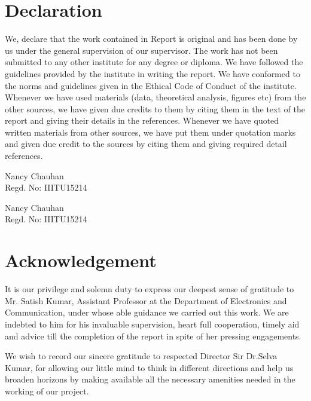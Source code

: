 \documentclass[a4paper,12 pt,oneside]{book}
\begin{document}
\chapter*{\centering Declaration}

We, declare that the work contained in Report is original and has been done by us under the general supervision of our supervisor. The work has not been submitted to any other institute for any degree or diploma. We have followed the guidelines provided by the institute in writing the report. We have conformed to the norms and guidelines given in the Ethical Code of Conduct of the institute. Whenever we have used materials (data, theoretical analysis, figures etc) from the other sources,  we have given due credits to them by citing them in the text of the report and giving their details in the references. Whenever we have quoted written materials from other sources, we have put them under quotation marks and given due credit to the sources by citing them and giving required detail references.

\vspace{2cm}
\hfill\begin{varwidth}{\textwidth}
Nancy Chauhan\\
Regd. No: IIITU15214


\vspace{2.0cm}

Nancy Chauhan\\
Regd. No: IIITU15214

\end{varwidth}

\chapter*{\centering Acknowledgement}

It is our privilege and solemn duty to express our deepest sense of gratitude to Mr. Satish Kumar, Assistant Professor at the Department of Electronics and Communication, under whose able guidance we carried out this work. We are indebted to him for his invaluable supervision, heart full cooperation, timely aid and advice till the completion of the report in spite of her pressing engagements.

We wish to record our sincere gratitude to respected Director Sir
Dr.Selva Kumar, for allowing our little mind to think in different directions and help us broaden horizons by making available all the necessary amenities needed in the working of our
project.
\end{document}

